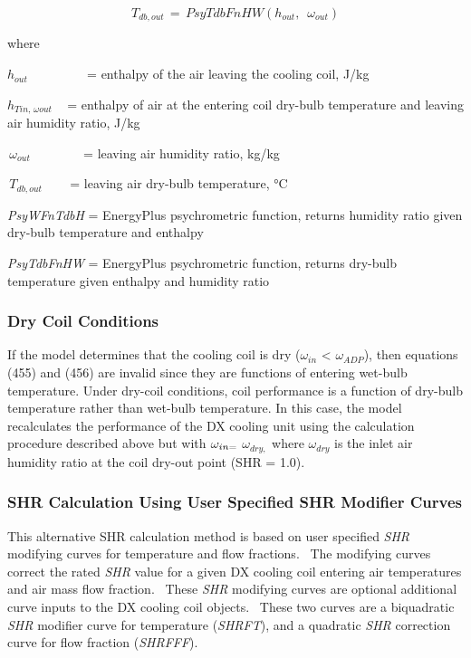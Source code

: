 \begin{equation}
{T_{db,out}}\, = \,PsyTdbFnHW({h_{out}},\,\,\,{\omega_{out}})
\end{equation}

where

\({h_{out}}\) ~~~~~~~~ = enthalpy of the air leaving the cooling coil, J/kg

\({h_{Tin,\,\omega out}}\) ~ = enthalpy of air at the entering coil dry-bulb temperature and leaving air humidity ratio, J/kg

\(\,{\omega_{out}}\) ~~~~~~~ = leaving air humidity ratio, kg/kg

\(\,{T_{db,out}}\) ~~~ = leaving air dry-bulb temperature, °C

\emph{PsyWFnTdbH} = EnergyPlus psychrometric function, returns humidity ratio given dry-bulb temperature and enthalpy

\emph{PsyTdbFnHW} = EnergyPlus psychrometric function, returns dry-bulb temperature given enthalpy and humidity ratio

\subsubsection{Dry Coil Conditions}\label{dry-coil-conditions}

If the model determines that the cooling coil is dry (\(\omega_{in}\) \textless{} \(\omega_{ADP}\)), then equations (455) and (456) are invalid since they are functions of entering wet-bulb temperature. Under dry-coil conditions, coil performance is a function of dry-bulb temperature rather than wet-bulb temperature. In this case, the model recalculates the performance of the DX cooling unit using the calculation procedure described above but with \(\omega_{in\\ =}\) \(\omega_{dry,}\) where \(\omega_{dry}\) is the inlet air humidity ratio at the coil dry-out point (SHR = 1.0).

\subsubsection{SHR Calculation Using User Specified SHR Modifier Curves}\label{shr-calculation-using-user-specified-shr-modifier-curves}

This alternative SHR calculation method is based on user specified \emph{SHR} modifying curves for temperature and flow fractions.~ The modifying curves correct the rated \emph{SHR} value for a given DX cooling coil entering air temperatures and air mass flow fraction.~ These \emph{SHR} modifying curves are optional additional curve inputs to the DX cooling coil objects.~ These two curves are a biquadratic \emph{SHR} modifier curve for temperature (\emph{SHRFT}), and a quadratic \emph{SHR} correction curve for flow fraction (\emph{SHRFFF}).


